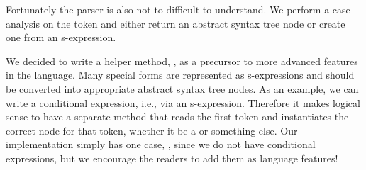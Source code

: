 Fortunately the parser is also not to difficult to understand. We perform a case analysis on the token and either return an abstract syntax tree node or create one from an s-expression.

We decided to write a helper method, , as a precursor to more advanced features in the language. Many special forms are represented as s-expressions and should be converted into appropriate abstract syntax tree nodes. As an example, we can write a conditional expression, i.e.,  via an s-expression. Therefore it makes logical sense to have a separate method that reads the first token and instantiates the correct node for that token, whether it be a  or something else. Our implementation simply has one case, , since we do not have conditional expressions, but we encourage the readers to add them as language features!
